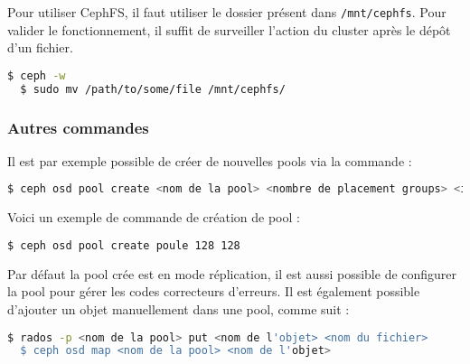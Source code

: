 Pour utiliser CephFS, il faut utiliser le dossier présent dans \verb|/mnt/cephfs|. Pour valider le fonctionnement, il suffit de surveiller l'action du cluster après le dépôt d'un fichier.
\vspace{3mm}
\begin{lstlisting}[language=bash]
  $ ceph -w
  $ sudo mv /path/to/some/file /mnt/cephfs/
\end{lstlisting}


\subsubsection{Autres commandes}

Il est par exemple possible de créer de nouvelles pools via la commande :
\vspace{3mm}
\begin{lstlisting}[language=bash]
  $ ceph osd pool create <nom de la pool> <nombre de placement groups> <idem>
\end{lstlisting}

Voici un exemple de commande de création de pool :
\vspace{3mm}
\begin{lstlisting}[language=bash]
  $ ceph osd pool create poule 128 128
\end{lstlisting}

Par défaut la pool crée est \og{}en mode\fg{} réplication, il est aussi possible de configurer la pool pour gérer les codes correcteurs d'erreurs. Il est également possible d'ajouter un objet manuellement dans une pool, comme suit :
\vspace{3mm}
\begin{lstlisting}[language=bash]
  $ rados -p <nom de la pool> put <nom de l'objet> <nom du fichier>
  $ ceph osd map <nom de la pool> <nom de l'objet>
\end{lstlisting}


